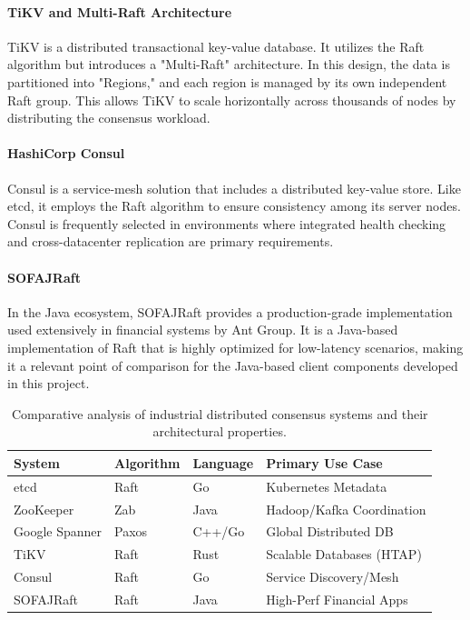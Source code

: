 \paragraph{TiKV and Multi-Raft Architecture}
TiKV \cite{TiKV2020} is a distributed transactional key-value database. It utilizes the Raft algorithm but introduces a "Multi-Raft" architecture. In this design, the data is partitioned into "Regions," and each region is managed by its own independent Raft group. This allows TiKV to scale horizontally across thousands of nodes by distributing the consensus workload.

\paragraph{HashiCorp Consul}
Consul \cite{Consul} is a service-mesh solution that includes a distributed key-value store. Like etcd, it employs the Raft algorithm to ensure consistency among its server nodes. Consul is frequently selected in environments where integrated health checking and cross-datacenter replication are primary requirements.

\paragraph{SOFAJRaft} 
In the Java ecosystem, SOFAJRaft \cite{SOFAJRaft} provides a production-grade implementation used extensively in financial systems by Ant Group. It is a Java-based implementation of Raft that is highly optimized for low-latency scenarios, making it a relevant point of comparison for the Java-based client components developed in this project.

\begin{table}[h]
\centering
\caption{Comparative analysis of industrial distributed consensus systems and their architectural properties.}
\label{tab:system_comparison}
\begin{tabular}{|l|l|l|l|}
\hline
\textbf{System} & \textbf{Algorithm} & \textbf{Language} & \textbf{Primary Use Case} \\ \hline
etcd            & Raft               & Go                & Kubernetes Metadata       \\ \hline
ZooKeeper       & Zab                & Java              & Hadoop/Kafka Coordination \\ \hline
Google Spanner  & Paxos              & C++/Go            & Global Distributed DB     \\ \hline
TiKV            & Raft               & Rust              & Scalable Databases (HTAP) \\ \hline
Consul          & Raft               & Go                & Service Discovery/Mesh    \\ \hline
SOFAJRaft       & Raft               & Java              & High-Perf Financial Apps  \\ \hline
\end{tabular}
\end{table}

